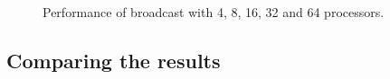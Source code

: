 \begin{figure}[h]
    \caption{Performance of broadcast with 4, 8, 16, 32 and 64 processors.}
    \label{PCM-mpi-3}
\end{figure}

\clearpage




\subsection{Comparing the results}
